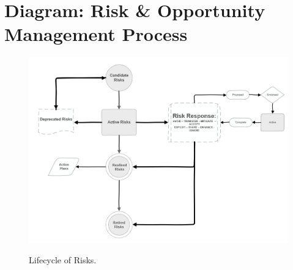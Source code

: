 \section{Diagram: Risk \& Opportunity Management Process}

\begin{figure}[t]
\caption{Lifecycle of Risks.}
\centering
\includegraphics[width=\textwidth]{risk-lifecycle-temp}
\label{fig:risk-lifecycle}
\end{figure}
